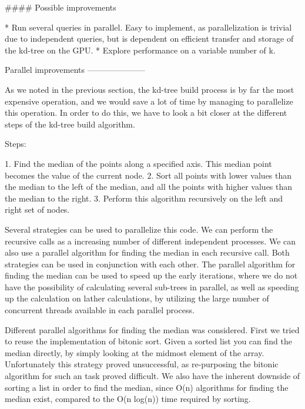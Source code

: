 #### Possible improvements

* Run several queries in parallel. Easy to implement, as parallelization is trivial due to independent queries, but is dependent on efficient transfer and storage of the kd-tree on the GPU.
* Explore performance on a variable number of k.


Parallel improvements
---------------------

As we noted in the previous section, the kd-tree build process is by far the most expensive operation, and we would save a lot of time by managing to parallelize this operation. In order to do this, we have to look a bit closer at the different steps of the kd-tree build algorithm.

Steps:

1. Find the median of the points along a specified axis. This median point becomes the value of the current node.
2. Sort all points with lower values than the median to the left of the median, and all the points with higher values than the median to the right.
3. Perform this algorithm recursively on the left and right set of nodes.

Several strategies can be used to parallelize this code. We can perform the recursive calls as a increasing number of different independent processes. We can also use a parallel algorithm for finding the median in each recursive call. Both strategies can be used in conjunction with each other. The parallel algorithm for finding the median can be used to speed up the early iterations, where we do not have the possibility of calculating several sub-trees in parallel, as well as speeding up the calculation on lather calculations, by utilizing the large number of concurrent threads available in each parallel process.

Different parallel algorithms for finding the median was considered. First we tried to reuse the implementation of bitonic sort. Given a sorted list you can find the median directly, by simply looking at the midmost element of the array. Unfortunately this strategy proved unsuccessful, as re-purposing the bitonic algorithm for such an task proved difficult. We also have the inherent downside of sorting a list in order to find the median, since O(n) algorithms for finding the median exist, compared to the O(n log(n)) time required by sorting.

